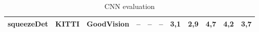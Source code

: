 \documentclass[twoside]{ctuthesis}
\theoremstyle{plain}
\theoremstyle{definition}
\theoremstyle{note}
\begin{document}
\begin{table}
{\begin{tabular}{|c|c|c|c|c|c|c|c|c|c|c|}
\multirow{-3}{*}{squeezeDet}                             & \multirow{-2}{*}{KITTI}                                             & GoodVision                                                         & --                                                                     & --                                                                 & --                                                                        & 3,1                                                                & 2,9                                                                   & 4,7                                                                  & 4,2                                                                & 3,7                                                             \\ \hline
\end{tabular}
}
\caption{CNN evaluation}
\label{tab:cnn_evaluation}
\end{table}
\end{document}
